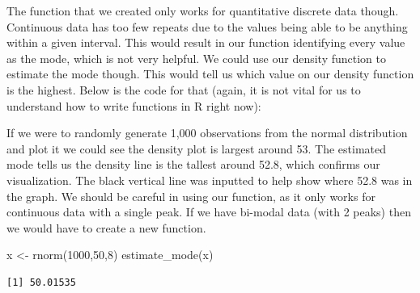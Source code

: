 \documentclass[
  letterpaper,
  DIV=11,
  numbers=noendperiod]{scrreprt}
\newenvironment{Shaded}{\begin{snugshade}}{\end{snugshade}}
\newcommand{\AttributeTok}[1]{\textcolor[rgb]{0.40,0.45,0.13}{#1}}
\newcommand{\ConstantTok}[1]{\textcolor[rgb]{0.56,0.35,0.01}{#1}}
\newcommand{\ControlFlowTok}[1]{\textcolor[rgb]{0.00,0.23,0.31}{\textbf{#1}}}
\newcommand{\DecValTok}[1]{\textcolor[rgb]{0.68,0.00,0.00}{#1}}
\newcommand{\FunctionTok}[1]{\textcolor[rgb]{0.28,0.35,0.67}{#1}}
\newcommand{\NormalTok}[1]{\textcolor[rgb]{0.00,0.23,0.31}{#1}}
\newcommand{\OtherTok}[1]{\textcolor[rgb]{0.00,0.23,0.31}{#1}}
\newcommand{\SpecialCharTok}[1]{\textcolor[rgb]{0.37,0.37,0.37}{#1}}
\begin{document}
The function that we created only works for quantitative discrete data
though. Continuous data has too few repeats due to the values being able
to be anything within a given interval. This would result in our
function identifying every value as the mode, which is not very helpful.
We could use our density function to estimate the mode though. This
would tell us which value on our density function is the highest. Below
is the code for that (again, it is not vital for us to understand how to
write functions in R right now):

\begin{Shaded}
\end{Shaded}

If we were to randomly generate 1,000 observations from the normal
distribution and plot it we could see the density plot is largest around
53. The estimated mode tells us the density line is the tallest around
52.8, which confirms our visualization. The black vertical line was
inputted to help show where 52.8 was in the graph. We should be careful
in using our function, as it only works for continuous data with a
single peak. If we have bi-modal data (with 2 peaks) then we would have
to create a new function.

\begin{Shaded}
\begin{Highlighting}[]
\NormalTok{x }\OtherTok{\textless{}{-}} \FunctionTok{rnorm}\NormalTok{(}\DecValTok{1000}\NormalTok{,}\DecValTok{50}\NormalTok{,}\DecValTok{8}\NormalTok{)}
\FunctionTok{estimate\_mode}\NormalTok{(x)}
\end{Highlighting}
\end{Shaded}

\begin{verbatim}
[1] 50.01535
\end{verbatim}
\end{document}
